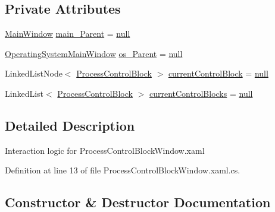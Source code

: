 \subsection*{Private Attributes}
\begin{DoxyCompactItemize}
\item 
\hyperlink{class_c_p_u___o_s___simulator_1_1_main_window}{Main\+Window} \hyperlink{class_c_p_u___o_s___simulator_1_1_process_control_block_window_a928d5159874200e6ca0fad00913d65e5}{main\+\_\+\+Parent} = \hyperlink{_old_01_process_01_flags_8cs_afb8e110345c45e74478894341ab6b28e}{null}
\item 
\hyperlink{class_c_p_u___o_s___simulator_1_1_operating_system_main_window}{Operating\+System\+Main\+Window} \hyperlink{class_c_p_u___o_s___simulator_1_1_process_control_block_window_acc4b72c5370a2bcda85b16e0801ce3d9}{os\+\_\+\+Parent} = \hyperlink{_old_01_process_01_flags_8cs_afb8e110345c45e74478894341ab6b28e}{null}
\item 
Linked\+List\+Node$<$ \hyperlink{class_c_p_u___o_s___simulator_1_1_operating___system_1_1_process_control_block}{Process\+Control\+Block} $>$ \hyperlink{class_c_p_u___o_s___simulator_1_1_process_control_block_window_a6019633d26586b0df1c4c2d6f008f6c9}{current\+Control\+Block} = \hyperlink{_old_01_process_01_flags_8cs_afb8e110345c45e74478894341ab6b28e}{null}
\item 
Linked\+List$<$ \hyperlink{class_c_p_u___o_s___simulator_1_1_operating___system_1_1_process_control_block}{Process\+Control\+Block} $>$ \hyperlink{class_c_p_u___o_s___simulator_1_1_process_control_block_window_a1cc81320d60155abc2d1fd7370aeeb9a}{current\+Control\+Blocks} = \hyperlink{_old_01_process_01_flags_8cs_afb8e110345c45e74478894341ab6b28e}{null}
\end{DoxyCompactItemize}


\subsection{Detailed Description}
Interaction logic for Process\+Control\+Block\+Window.\+xaml 



Definition at line 13 of file Process\+Control\+Block\+Window.\+xaml.\+cs.



\subsection{Constructor \& Destructor Documentation}
\hypertarget{class_c_p_u___o_s___simulator_1_1_process_control_block_window_afd4e9b7961d1f1c66aa037dba54d39a8}{}
